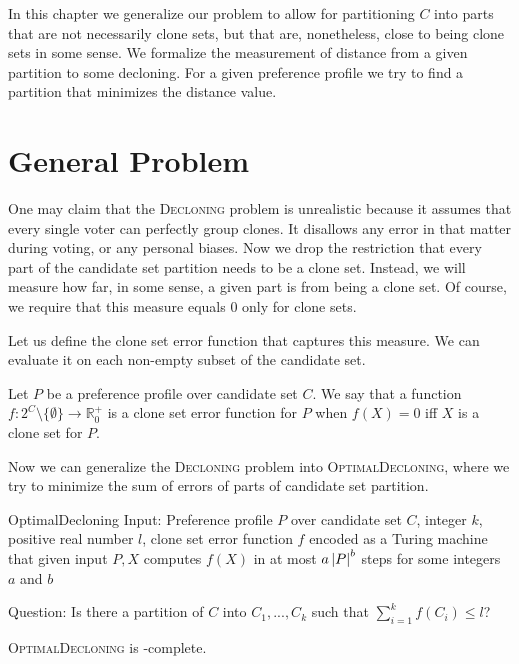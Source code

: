 In this chapter we generalize our problem to allow for partitioning $C$ into parts
that are not necessarily clone sets, but that are, nonetheless, close to being clone sets in some sense.
We formalize the measurement of distance from a given partition to some decloning.
For a given preference profile we try to find a partition that minimizes the distance value.

\section{General Problem}

One may claim that the \textsc{Decloning} problem is unrealistic
because it assumes that every single voter can perfectly group clones.
It disallows any error in that matter during voting, or any personal biases.
Now we drop the restriction that every part of the candidate set partition needs to be a clone set.
Instead, we will measure how far, in some sense, a given part is from being a clone set.
Of course, we require that this measure equals $0$ only for clone sets.

Let us define the clone set error function that captures this measure.
We can evaluate it on each non-empty subset of the candidate set.

\begin{defn}
Let $P$ be a preference profile over candidate set $C$.
We say that a function
$f: 2^C \setminus \{\emptyset\} \rightarrow \mathbb{R}_0^+$
is a clone set error function for $P$ when $f(X) = 0$ iff $X$ is a clone set for $P$.
\end{defn}

Now we can generalize the \textsc{Decloning} problem into \textsc{OptimalDecloning},
where we try to minimize the sum of errors of parts of candidate set partition.

\begin{problem}{OptimalDecloning}
	Input: Preference profile $P$ over candidate set $C$, integer $k$, positive real number $l$,
        clone set error function $f$ encoded as a Turing machine that given input $P,X$ computes $f(X)$
        in at most $a \left\vert P \right\vert^b$ steps for some integers $a$ and $b$

	Question: Is there a partition of $C$ into $C_1, ..., C_k$ such that $\sum_{i=1}^k f(C_i) \leq l$?
\end{problem}

\begin{thm} \label{optdecl}
	\textsc{OptimalDecloning} is \np-complete.
\end{thm}


